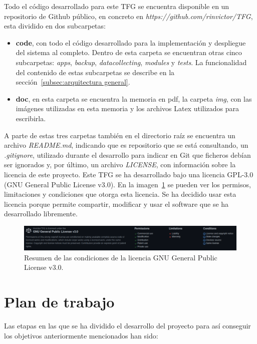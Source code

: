 \documentclass[a4paper, 12pt, oneside]{book}
\begin{document}
Todo el código desarrollado para este TFG se encuentra disponible en un repositorio de Github público, en concreto en \textit{https://github.com/rinvictor/TFG}, esta dividido en dos subcarpetas: 
\begin{itemize}
\item \textbf{code}, con todo el código desarrollado para la implementación y despliegue del sistema al completo. Dentro de esta carpeta se encuentran otras cinco subcarpetas: \textit{apps}, \textit{backup}, \textit{datacollecting}, \textit{modules} y \textit{tests}. La funcionalidad del contenido de estas subcarpetas se describe en la sección~\ref{subsec:arquitectura general}.

\item \textbf{doc}, en esta carpeta se encuentra la memoria en pdf, la carpeta \textit{img}, con las imágenes utilizadas en esta memoria y los archivos Latex utilizados para escribirla.
\end{itemize}

A parte de estas tres carpetas también en el directorio raíz se encuentra un archivo \textit{README.md}, indicando que es repositorio que se está consultando, un \textit{.gitignore}, utilizado durante el desarrollo para indicar en Git que ficheros debían ser ignorados y, por último, un archivo \textit{LICENSE}, con información sobre la licencia de este proyecto.
Este TFG se ha desarrollado bajo una licencia GPL-3.0 (GNU General Public License v3.0). En la imagen~\ref{figura:license} se pueden ver los permisos, limitaciones y condiciones que otorga esta licencia. Se ha decidido usar esta licencia porque permite compartir, modificar y usar el software que se ha desarrollado libremente.

\begin{figure}[H]
	\centering
    \includegraphics[width=15cm, keepaspectratio]{img/license}
    \caption{Resumen de las condiciones de la licencia GNU General Public License v3.0.}
    \label{figura:license}
\end{figure}

\section{Plan de trabajo}
\label{plan de trabajo}
Las etapas en las que se ha dividido el desarrollo del proyecto para así conseguir los objetivos anteriormente mencionados han sido:
\end{document}

